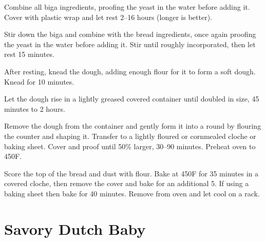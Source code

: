 \documentclass[oneside]{book}  %
\def\thisrecipe{}  %
\newcommand{\recipe}[1]{\section{#1}\def\thisrecipe{: #1}} %
\newcommand{\degF}{\textdegree F\xspace}
\begin{document}
\begin{directions}
  \item Combine all biga ingredients, proofing the yeast in the water before
  adding it. Cover with plastic wrap and let rest 2--16 hours (longer is
  better).

  \item Stir down the biga and combine with the bread ingredients, once again
  proofing the yeast in the water before adding it. Stir until roughly
  incorporated, then let rest 15 minutes.

  \item After resting, knead the dough, adding enough flour for it to form a
  soft dough. Knead for 10 minutes.

  \item Let the dough rise in a lightly greased covered container until doubled
  in size, 45 minutes to 2 hours.

  \columnbreak

  \item Remove the dough from the container and gently form it into a round by
  flouring the counter and shaping it. Transfer to a lightly floured or
  cornmealed cloche or baking sheet. Cover and proof until 50\% larger, 30--90
  minutes. Preheat oven to 450\degF.

  \item Score the top of the bread and dust with flour. Bake at 450\degF for 35
  minutes in a covered cloche, then remove the cover and bake for an additional
  5. If using a baking sheet then bake for 40 minutes. Remove from oven and let
  cool on a rack.
\end{directions}
\recipe{Savory Dutch Baby} \label{recipe:savory_dutch_baby} %
\end{document}
